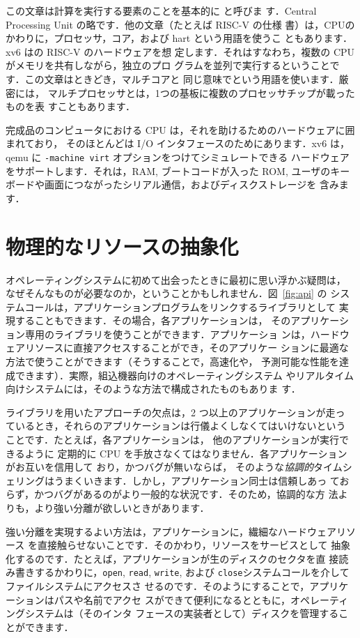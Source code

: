 この文章は計算を実行する要素のことを基本的に  と呼びま
す．Central Processing Unit の略です．他の文章（たとえば RISC-V の仕様
書）は，CPUのかわりに，プロセッサ，コア，および hart という用語を使うこ
ともあります．xv6 はの RISC-V のハードウェアを想
定します．それはすなわち，複数の CPU がメモリを共有しながら，独立のプロ
グラムを並列で実行するということです．この文章はときどき，マルチコアと
同じ意味でという用語を使います．厳密には，
マルチプロセッサとは，1つの基板に複数のプロセッサチップが載ったものを表
すこともあります．

完成品のコンピュータにおける CPU は，それを助けるためのハードウェアに囲まれており，
そのほとんどは I/O インタフェースのためにあります．xv6 は，qemu に
\texttt{-machine virt} オプションをつけてシミュレートできる
ハードウェアをサポートします．それは，RAM, ブートコードが入った ROM, 
ユーザのキーボードや画面につながったシリアル通信，およびディスクストレージを
含みます．


\section{物理的なリソースの抽象化}

オペレーティングシステムに初めて出会ったときに最初に思い浮かぶ疑問は，
なぜそんなものが必要なのか，ということかもしれません．図~\ref{fig:api} の
システムコールは，アプリケーションプログラムをリンクするライブラリとして
実現することもできます．その場合，各アプリケーションは，
そのアプリケーション専用のライブラリを使うことができます．アプリケーショ
ンは，ハードウェアリソースに直接アクセスすることができ，そのアプリケー
ションに最適な方法で使うことができます（そうすることで，高速化や，
予測可能な性能を達成できます）．実際，組込機器向けのオペレーティングシステム
やリアルタイム向けシステムには，そのような方法で構成されたものもありま
す．

ライブラリを用いたアプローチの欠点は，2 つ以上のアプリケーションが走っ
ているとき，それらのアプリケーションは行儀よくしなくてはいけないという
ことです．たとえば，各アプリケーションは，
他のアプリケーションが実行できるように
定期的に CPU を手放さなくてはなりません．各アプリケーションがお互いを信用して
おり，かつバグが無いならば，
そのような\textit{協調的}タイムシェリングはうまくいきます．しかし，アプリケーション同士は信頼しあっ
ておらず，かつバグがあるのがより一般的な状況です．そのため，協調的な方
法よりも，より強い分離が欲しいときがあります．

強い分離を実現するよい方法は，アプリケーションに，繊細なハードウェアリソース
を直接触らせないことです．そのかわり，リソースをサービスとして
抽象化するのです．たとえば，アプリケーションが生のディスクのセクタを直
接読み書きするかわりに，\lstinline{open}, \lstinline{read}, \lstinline{write},
および \lstinline{close}システムコールを介してファイルシステムにアクセスさ
せるのです．そのようにすることで，アプリケーションはパスや名前でアクセ
スができて便利になるとともに，オペレーティングシステムは（そのインタ
フェースの実装者として）ディスクを管理することができます．

